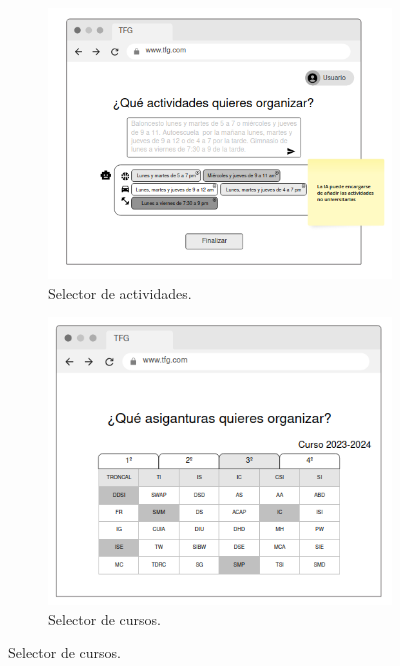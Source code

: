 \begin{figure}[H]
    \begin{subfigure}[b]{0.48\textwidth}
        \includegraphics[width=\textwidth]{./imagenes/Mockup_ia.png}
        \caption{Selector de actividades.}
    \end{subfigure}
    \hfill
    \begin{subfigure}[b]{0.48\textwidth}
        \includegraphics[width=\textwidth]{./imagenes/Mockup_cursos.png}
        \caption{Selector de cursos.}
    \end{subfigure}
    

\end{figure}
